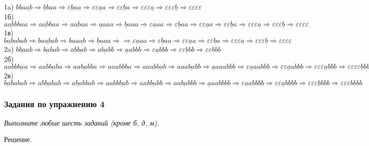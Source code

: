 \documentclass[12pt,a4paper]{article}
\newcommand{\tod}{\Longrightarrow}
\begin{document}
\setlength{\parindent}{0pt}
1a) $bba\underline{ab}\tod\underline{b}baa\tod\varepsilon\underline{b}aa\tod\varepsilon\varepsilon\underline{a}a\tod\varepsilon\varepsilon\underline{b}a\tod\varepsilon\varepsilon\varepsilon\underline{a}\tod\varepsilon\varepsilon\varepsilon\underline{b}\tod\varepsilon\varepsilon\varepsilon\varepsilon$ \\
1б)$a\underline{ab}bbaa\tod a\underline{ab}baa\tod a\underline{ab}aa\tod\underline{a}aaa\tod \underline{b}aaa\tod \varepsilon\underline{a}aa
\tod \varepsilon\underline{b}aa\tod \varepsilon\varepsilon\underline{a}a\tod \varepsilon\varepsilon\underline{b}a\tod \varepsilon\varepsilon\varepsilon\underline{a}\tod \varepsilon\varepsilon\varepsilon\underline{b}\tod \varepsilon\varepsilon\varepsilon\varepsilon$ \\
1в)$b\underline{ab}abab\tod ba\underline{ab}ab\tod baa\underline{ab}\tod \underline{b}aaa\tod \tod \varepsilon\underline{a}aa
\tod \varepsilon\underline{b}aa\tod \varepsilon\varepsilon\underline{a}a\tod \varepsilon\varepsilon\underline{b}a\tod \varepsilon\varepsilon\varepsilon\underline{a}\tod \varepsilon\varepsilon\varepsilon\underline{b}\tod \varepsilon\varepsilon\varepsilon\varepsilon$ \\
2a) $ b\underline{ba}ab\tod \underline{ba}bab\tod ab\underline{ba}b\tod a\underline{ba}bb\tod \underline{a}abbb\tod \varepsilon\underline{a}bbb\tod \varepsilon\varepsilon\underline{b}bb\tod \varepsilon\varepsilon bbb$\\
2б) $ aabb\underline{ba}a\tod aab\underline{ba}ba\tod aa\underline{ba}bba\tod aaabb\underline{ba}\tod aaab\underline{ba}b\tod aaa\underline{ba}bb\tod \underline{a}aaabbb\tod \varepsilon\underline{a}aabbb\tod \varepsilon\varepsilon\underline{a}abbb\tod \varepsilon\varepsilon\varepsilon\underline{a}bbb\tod \varepsilon\varepsilon\varepsilon\varepsilon\underline{b}bb\tod \varepsilon\varepsilon\varepsilon\varepsilon bbb$\\ 
2в) $ \underline{ba}babab\tod ab\underline{ba}bab\tod a\underline{ba}bbab\tod aabb\underline{ba}b\tod aab\underline{ba}bb\tod aa\underline{ba}bbb\tod \underline{a}aabbbb\tod \varepsilon\underline{a}abbbb\tod \varepsilon\varepsilon\underline{a}bbbb\tod \varepsilon\varepsilon\varepsilon\underline{b}bbb\tod \varepsilon\varepsilon\varepsilon bbbb$\\


\subsubsection*{Задания по упражнению 4}

\emph{Выполните любые шесть заданий (кроме б, д, м).}

Решение.
\end{document}
